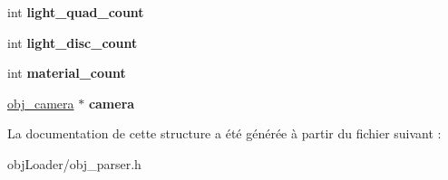 \begin{DoxyCompactItemize}
\item 
\hypertarget{structobj__scene__data_a785a4b7a965ed5b5d1d89e572964cde3}{int {\bfseries light\-\_\-quad\-\_\-count}}\label{structobj__scene__data_a785a4b7a965ed5b5d1d89e572964cde3}

\item 
\hypertarget{structobj__scene__data_ac408db28b6d3821348cd2385b4b64dae}{int {\bfseries light\-\_\-disc\-\_\-count}}\label{structobj__scene__data_ac408db28b6d3821348cd2385b4b64dae}

\item 
\hypertarget{structobj__scene__data_a51b162f8c0fad5464fc767f5a6fe0881}{int {\bfseries material\-\_\-count}}\label{structobj__scene__data_a51b162f8c0fad5464fc767f5a6fe0881}

\item 
\hypertarget{structobj__scene__data_a54766e9e185b9a668ebb1d41aa105eb6}{\hyperlink{structobj__camera}{obj\-\_\-camera} $\ast$ {\bfseries camera}}\label{structobj__scene__data_a54766e9e185b9a668ebb1d41aa105eb6}

\end{DoxyCompactItemize}


La documentation de cette structure a été générée à partir du fichier suivant \-:\begin{DoxyCompactItemize}
\item 
obj\-Loader/obj\-\_\-parser.\-h\end{DoxyCompactItemize}
